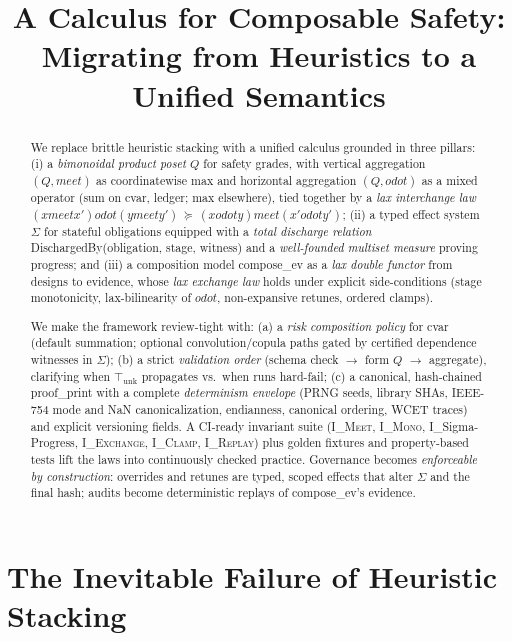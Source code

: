 \documentclass[11pt]{article}
\title{A Calculus for Composable Safety:\\ \large Migrating from Heuristics to a Unified Semantics}
\author{} %
\date{}   %
\theoremstyle{plain}
\theoremstyle{definition}
\theoremstyle{remark}
\def\Sig{\Sigma}%
\def\composeev{compose\_ev}%
\def\vmeet{meet}%
\def\hplus{odot}%
\def\code#1{#1}%
\def\ISigma{I\_Sigma-Progress}%
\DeclareRobustCommand{\Sig}{\texorpdfstring{\ensuremath{\Sigma}}{\Sigma}}   %
\DeclareMathOperator{\composeevOp}{compose\_ev}
\DeclareRobustCommand{\composeev}{\texorpdfstring{\ensuremath{\composeevOp}}{compose\_ev}}
\newcommand{\unk}{\top_{\mathrm{unk}}}         %
\newcommand{\vmeet}{\wedge}                    %
\newcommand{\hplus}{\odot}                     %
\newcommand{\geqQ}{\succeq}
\newcommand{\code}[1]{\texttt{\textup{#1}}}    %
\newcommand{\ledger}{\code{ledger}}
\newcommand{\cvar}{\code{cvar}}
\newcommand{\IMeet}{\textsc{I\_Meet}}
\newcommand{\IMono}{\textsc{I\_Mono}}
\DeclareRobustCommand{\ISigma}{%
  \texorpdfstring{\textsc{I\_\ensuremath{\Sigma}-Progress}}{\textsc{I\_Sigma-Progress}}%
}
\newcommand{\IExchange}{\textsc{I\_Exchange}}
\newcommand{\IClamp}{\textsc{I\_Clamp}}
\newcommand{\IReplay}{\textsc{I\_Replay}}
\def\Sig{\Sigma}%
\def\composeev{compose\_ev}%
\def\vmeet{meet}%
\def\hplus{odot}%
\def\code#1{#1}%
\begin{document}
\maketitle

\tableofcontents
\bigskip

\begin{abstract}
We replace brittle heuristic stacking with a unified calculus grounded in three pillars: (i) a \emph{bimonoidal product poset} $Q$ for safety grades, with vertical aggregation $(Q,\vmeet)$ as coordinatewise max and horizontal aggregation $(Q,\hplus)$ as a mixed operator (sum on \cvar, \ledger; max elsewhere), tied together by a \emph{lax interchange law} $(x\vmeet x')\hplus(y\vmeet y') \,\geqQ\, (x\hplus y)\vmeet(x'\hplus y')$; (ii) a typed effect system $\Sig$ for stateful obligations equipped with a \emph{total discharge relation} \code{DischargedBy(obligation, stage, witness)} and a \emph{well-founded multiset measure} proving progress; and (iii) a composition model \composeev{} as a \emph{lax double functor} from designs to evidence, whose \emph{lax exchange law} holds under explicit side-conditions (stage monotonicity, lax-bilinearity of $\hplus$, non-expansive retunes, ordered clamps).

We make the framework review-tight with: (a) a \emph{risk composition policy} for \cvar{} (default summation; optional convolution/copula paths gated by certified dependence witnesses in $\Sig$); (b) a strict \emph{validation order} (schema check $\rightarrow$ form $Q$ $\rightarrow$ aggregate), clarifying when $\unk$ propagates vs.\ when runs hard-fail; (c) a canonical, hash-chained \code{proof\_print} with a complete \emph{determinism envelope} (PRNG seeds, library SHAs, IEEE-754 mode and NaN canonicalization, endianness, canonical ordering, WCET traces) and explicit versioning fields. A CI-ready invariant suite (\IMeet, \IMono, \ISigma, \IExchange, \IClamp, \IReplay) plus golden fixtures and property-based tests lift the laws into continuously checked practice. Governance becomes \emph{enforceable by construction}: overrides and retunes are typed, scoped effects that alter $\Sig$ and the final hash; audits become deterministic replays of \composeev{}’s evidence.
\end{abstract}



\section{The Inevitable Failure of Heuristic Stacking}
\label{sec:failure-of-stacking}
\end{document}
